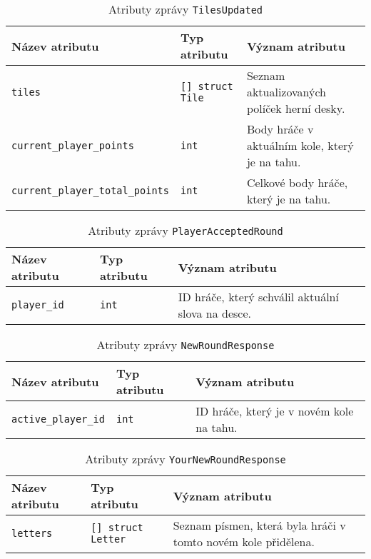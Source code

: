 \documentclass[12pt, a4paper]{article}
\begin{document}
\begin{center}
		\begin{table}[!ht]
		     \caption{Atributy zprávy \texttt{TilesUpdated}}
		\begin{tabularx}{\textwidth}{|l|l|X|}
			\hline
			\textbf{Název atributu} & \textbf{Typ atributu} & \textbf{Význam atributu} \\ 
			\hline
			\texttt{tiles}          &\texttt{[] struct Tile}&Seznam aktualizovaných políček herní desky.\\
			\hline
			\texttt{current\_player\_points}          &\texttt{int}&Body hráče v aktuálním kole, který je na tahu.\\
			\hline
			\texttt{current\_player\_total\_points}          &\texttt{int}&Celkové body hráče, který je na tahu.\\
			\hline
		\end{tabularx}
		\end{table}
\end{center}  	

\begin{center}
		\begin{table}[!ht]
		     \caption{Atributy zprávy \texttt{PlayerAcceptedRound}}
		\begin{tabularx}{\textwidth}{|l|l|X|}
			\hline
			\textbf{Název atributu} & \textbf{Typ atributu} & \textbf{Význam atributu} \\ 
			\hline
			\texttt{player\_id}          &\texttt{int}&ID hráče, který schválil aktuální slova na desce.\\
			\hline
		\end{tabularx}
		\end{table}
\end{center}  	

\begin{center}
		\begin{table}[!ht]
		     \caption{Atributy zprávy \texttt{NewRoundResponse}}
		\begin{tabularx}{\textwidth}{|l|l|X|}
			\hline
			\textbf{Název atributu} & \textbf{Typ atributu} & \textbf{Význam atributu} \\ 
			\hline
			\texttt{active\_player\_id}          &\texttt{int}&ID hráče, který je v novém kole na tahu.\\
			\hline
		\end{tabularx}
		\end{table}
\end{center}  	

\begin{center}
		\begin{table}[!ht]
		     \caption{Atributy zprávy \texttt{YourNewRoundResponse}}
		\begin{tabularx}{\textwidth}{|l|l|X|}
			\hline
			\textbf{Název atributu} & \textbf{Typ atributu} & \textbf{Význam atributu} \\ 
			\hline
			\texttt{letters}          &\texttt{[] struct Letter}&Seznam písmen, která byla hráči v tomto novém kole přidělena.\\
			\hline
		\end{tabularx}
		\end{table}
\end{center}  	
\end{document}
